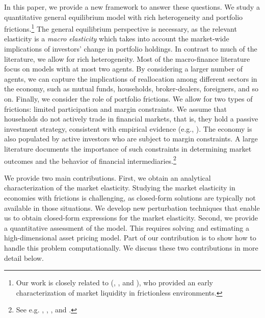 In this paper, we provide a new framework to answer these questions.
We study a quantitative general equilibrium model with rich heterogeneity and portfolio frictions.\footnote{Our work is closely related to \citeauthor{johnson2006dynamic} (\citeyear{johnson2006dynamic}, \citeyear{johnson2008volume}, and \citeyear{johnson2009liquid}), who provided an early characterization of market liquidity in frictionless environments.}
The general equilibrium perspective is necessary, as the relevant elasticity is a \textit{macro elasticity} which takes into account the market-wide implications of investors' change in portfolio holdings. 
In contrast to much of the literature, we allow for rich heterogeneity. 
Most of the macro-finance literature focus on models with at most two agents. By considering a larger number of agents, we can capture the implications of reallocation among different sectors in the economy, such as mutual funds, households, broker-dealers, foreigners, and so on. 
Finally, we consider the role of portfolio frictions. 
We allow for two types of frictions: limited participation and margin constraints. 
We assume that households do not actively trade in financial markets, that is, they hold a passive investment strategy, consistent with empirical evidence (e.g., \citealp{brunnermeier2008wealth}).
The economy is also populated by active investors who are subject to margin constraints. 
A large literature documents the importance of such constraints in determining market outcomes and the behavior of financial intermediaries.\footnote{See e.g. \citet{brunnermeier2009market}, \citet{garleanu2011margin}, \citet{chabakauri2013dynamic}, and \citet{adrian2014procyclical}.}

We provide two main contributions. 
First, we obtain an analytical characterization of the market elasticity. 
Studying the market elasticity in economies with frictions is challenging, as closed-form solutions are typically not available in those situations. 
We develop new perturbation techniques that enable us to obtain closed-form expressions for the market elasticity. 
Second, we provide a quantitative assessment of the model. 
This requires solving and estimating a high-dimensional asset pricing model.
Part of our contribution is to show how to handle this problem computationally. 
We discuss these two contributions in more detail below. 

